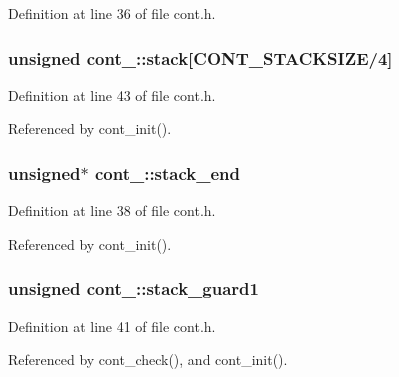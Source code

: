 Definition at line 36 of file cont.\+h.

\subsubsection[{\texorpdfstring{stack}{stack}}]{\setlength{\rightskip}{0pt plus 5cm}unsigned cont\+\_\+\+::stack\mbox{[}{\bf C\+O\+N\+T\+\_\+\+S\+T\+A\+C\+K\+S\+I\+ZE}/4\mbox{]}}\hypertarget{structcont___abc9f985ead0aa2c6795818c0bce6f9c1}{}\label{structcont___abc9f985ead0aa2c6795818c0bce6f9c1}


Definition at line 43 of file cont.\+h.



Referenced by cont\+\_\+init().

\subsubsection[{\texorpdfstring{stack\+\_\+end}{stack_end}}]{\setlength{\rightskip}{0pt plus 5cm}unsigned$\ast$ cont\+\_\+\+::stack\+\_\+end}\hypertarget{structcont___ab6e542a519497e515e2d3a62030a1f61}{}\label{structcont___ab6e542a519497e515e2d3a62030a1f61}


Definition at line 38 of file cont.\+h.



Referenced by cont\+\_\+init().

\subsubsection[{\texorpdfstring{stack\+\_\+guard1}{stack_guard1}}]{\setlength{\rightskip}{0pt plus 5cm}unsigned cont\+\_\+\+::stack\+\_\+guard1}\hypertarget{structcont___a17c9f5d8bc954cc0381bdbe63d350048}{}\label{structcont___a17c9f5d8bc954cc0381bdbe63d350048}


Definition at line 41 of file cont.\+h.



Referenced by cont\+\_\+check(), and cont\+\_\+init().

